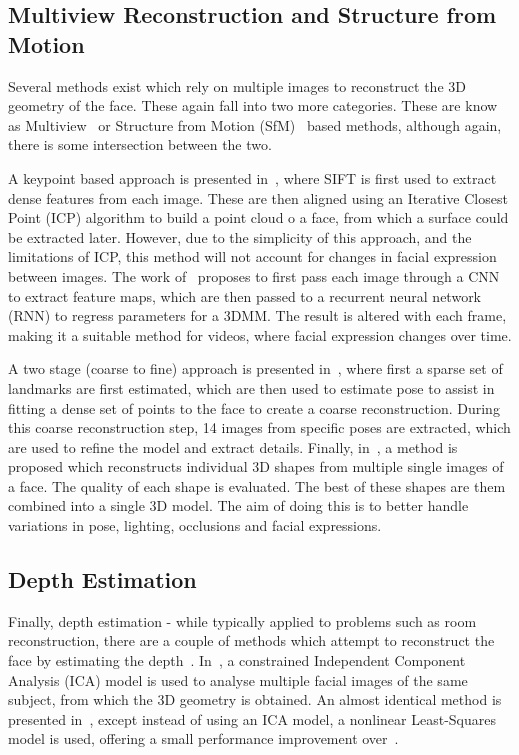 \subsection{Multiview Reconstruction and Structure from Motion}

Several methods exist which rely on multiple images to reconstruct the
3D geometry of the face. These again fall into two more
categories. These are know as Multiview~\cite{mayo20093d,dou2018multi}
or Structure from Motion
(SfM)~\cite{dou2018multi,dai2018coarse,Piotraschke_2016_CVPR} based
methods, although again, there is some intersection between the two.

A keypoint based approach is presented in~\cite{mayo20093d}, where
SIFT is first used to extract dense features from each image. These
are then aligned using an Iterative Closest Point (ICP) algorithm to
build a point cloud o a face, from which a surface could be extracted
later. However, due to the simplicity of this approach, and the
limitations of ICP, this method will not account for changes in facial
expression between images. The work of~\cite{dou2018multi} proposes to
first pass each image through a CNN to extract feature maps, which are
then passed to a recurrent neural network (RNN) to regress parameters
for a 3DMM. The result is altered with each frame, making it a
suitable method for videos, where facial expression changes over time.

A two stage (coarse to fine) approach is presented
in~\cite{dai2018coarse}, where first a sparse set of landmarks are
first estimated, which are then used to estimate pose to assist in
fitting a dense set of points to the face to create a coarse
reconstruction. During this coarse reconstruction step, 14 images from
specific poses are extracted, which are used to refine the model and
extract details. Finally, in~\cite{Piotraschke_2016_CVPR}, a method is
proposed which reconstructs individual 3D shapes from multiple single
images of a face. The quality of each shape is evaluated. The best of
these shapes are them combined into a single 3D model. The aim of
doing this is to better handle variations in pose, lighting,
occlusions and facial expressions.

\subsection{Depth Estimation}

Finally, depth estimation - while typically applied to problems such
as room reconstruction, there are a couple of methods which attempt to
reconstruct the face by estimating the
depth~\cite{sun2011depth,sun2013depth}. In~\cite{sun2011depth}, a
constrained Independent Component Analysis (ICA) model is used to
analyse multiple facial images of the same subject, from which the 3D
geometry is obtained. An almost identical method is presented
in~\cite{sun2013depth}, except instead of using an ICA model, a
nonlinear Least-Squares model is used, offering a small performance
improvement over~\cite{sun2011depth}.

